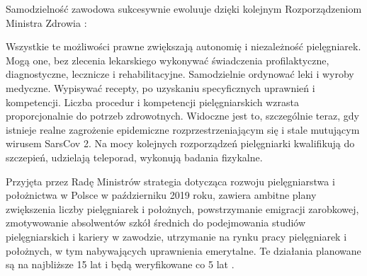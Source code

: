\documentclass[a4paper,12pt,twoside,openright]{mwrep}
\begin{document}
Samodzielność zawodowa sukcesywnie ewoluuje dzięki kolejnym Rozporządzeniom Ministra Zdrowia \cite{akty}:

Wszystkie te możliwości prawne zwiększają autonomię i niezależność pielęgniarek. Mogą one, bez zlecenia lekarskiego wykonywać świadczenia profilaktyczne, diagnostyczne, lecznicze i rehabilitacyjne. Samodzielnie ordynować leki i wyroby medyczne. Wypisywać recepty, po uzyskaniu specyficznych uprawnień i kompetencji. Liczba procedur i kompetencji pielęgniarskich wzrasta proporcjonalnie do potrzeb zdrowotnych. Widoczne jest to, szczególnie teraz, gdy istnieje realne zagrożenie epidemiczne rozprzestrzeniającym się i stale mutującym wirusem SarsCov 2. Na mocy kolejnych rozporządzeń pielęgniarki kwalifikują do szczepień, udzielają teleporad, wykonują badania fizykalne.

Przyjęta przez Radę Ministrów strategia dotycząca rozwoju pielęgniarstwa i położnictwa w Polsce   w październiku 2019 roku, zawiera ambitne plany zwiększenia liczby pielęgniarek i położnych, powstrzymanie emigracji zarobkowej, zmotywowanie absolwentów szkół średnich do podejmowania studiów pielęgniarskich i kariery w zawodzie, utrzymanie na rynku pracy pielęgniarek i położnych, w tym nabywających uprawnienia emerytalne. Te działania planowane są na najbliższe 15 lat i będą weryfikowane co 5 lat \cite{strategia}.
\end{document}
